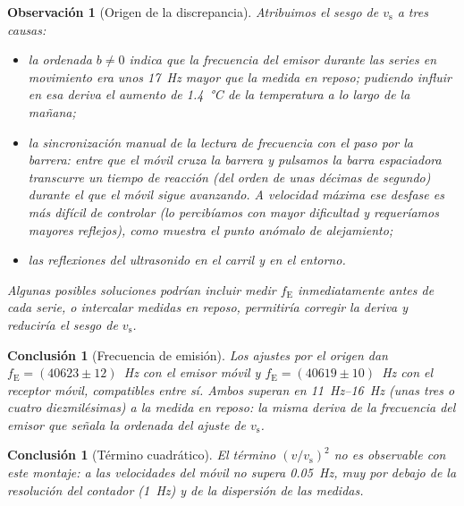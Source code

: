 \documentclass[a4paper,11pt]{amsart}
\numberwithin{equation}{section}
\newcommand{\vs}{v_{\mathrm{s}}}              %
\newcommand{\fE}{f_{\mathrm{E}}}              %
\theoremstyle{cienplano}
\newtheorem{conclusion}[proposicion]{Conclusión}
\theoremstyle{ciendef}
\theoremstyle{cienobs}
\newtheorem{observacion}[proposicion]{Observación}
\begin{document}
\begin{observacion}[Origen de la discrepancia]\label{obs:discrepancia}
Atribuimos el sesgo de $\vs$ a tres causas:
\begin{itemize}
  \item la ordenada $b\neq0$ indica que la frecuencia del emisor durante las
    series en movimiento era unos \SI{17}{\hertz} mayor que la medida en
    reposo; pudiendo influir en esa deriva el aumento de \SI{1,4}{\celsius} de la
    temperatura a lo largo de la mañana;
  \item la sincronización manual de la lectura de frecuencia con el paso por la
    barrera: entre que el móvil cruza la barrera y pulsamos la barra espaciadora
    transcurre un tiempo de reacción (del orden de unas décimas de segundo)
    durante el que el móvil sigue avanzando. A velocidad máxima ese desfase es
    más difícil de controlar (lo percibíamos con mayor dificultad y requeríamos mayores reflejos), como muestra el punto anómalo de alejamiento;
  \item las reflexiones del ultrasonido en el carril y en el entorno.
\end{itemize}
Algunas posibles soluciones podrían incluir medir $\fE$ inmediatamente antes de cada serie, o intercalar medidas en reposo,
permitiría corregir la deriva y reduciría el sesgo de $\vs$.
\end{observacion}

\begin{conclusion}[Frecuencia de emisión]\label{conc:fE}
Los ajustes por el origen dan $\fE=(\num{40623}\pm\num{12})$~Hz con el emisor móvil
y $\fE=(\num{40619}\pm\num{10})$~Hz con el receptor móvil, compatibles entre sí.
Ambos superan en \SIrange{11}{16}{\hertz} (unas tres o cuatro diezmilésimas) a la
medida en reposo: la misma deriva de la frecuencia del emisor que señala la
ordenada del ajuste de $\vs$.
\end{conclusion}

\begin{conclusion}[Término cuadrático]\label{conc:cuad}
El término $(v/\vs)^{2}$ no es observable con este montaje: a las velocidades del
móvil no supera \SI{0,05}{\hertz}, muy por debajo de la resolución del contador
(\SI{1}{\hertz}) y de la dispersión de las medidas.
\end{conclusion}

\newpage
\printbibliography[title={Referencias}]
\end{document}
